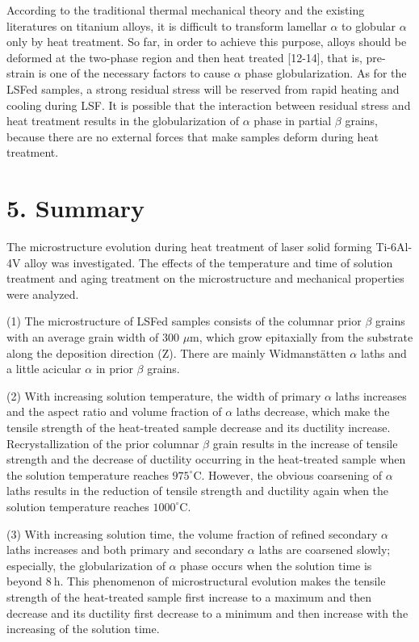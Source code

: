 \documentclass[10pt]{article}
\begin{document}
According to the traditional thermal mechanical theory and the existing literatures on titanium alloys, it is difficult to transform lamellar $\alpha$ to globular $\alpha$ only by heat treatment. So far, in order to achieve this purpose, alloys should be deformed at the two-phase region and then heat treated [12-14], that is, pre-strain is one of the necessary factors to cause $\alpha$ phase globularization. As for the LSFed samples, a strong residual stress will be reserved from rapid heating and cooling during LSF. It is possible that the interaction between residual stress and heat treatment results in the globularization of $\alpha$ phase in partial $\beta$ grains, because there are no external forces that make samples deform during heat treatment.

\section*{5. Summary}
The microstructure evolution during heat treatment of laser solid forming Ti-6Al-4V alloy was investigated. The effects of the temperature and time of solution treatment and aging treatment on the microstructure and mechanical properties were analyzed.

(1) The microstructure of LSFed samples consists of the columnar prior $\beta$ grains with an average grain width of 300 $\mu \mathrm{m}$, which grow epitaxially from the substrate along the deposition direction (Z). There are mainly Widmanstätten $\alpha$ laths and a little acicular $\alpha$ in prior $\beta$ grains.

(2) With increasing solution temperature, the width of primary $\alpha$ laths increases and the aspect ratio and volume fraction of $\alpha$ laths decrease, which make the tensile strength of the heat-treated sample decrease and its ductility increase. Recrystallization of the prior columnar $\beta$ grain results in the increase of tensile strength and the decrease of ductility occurring in the heat-treated sample when the solution temperature reaches $975^{\circ} \mathrm{C}$. However, the obvious coarsening of $\alpha$ laths results in the reduction of tensile strength and ductility again when the solution temperature reaches $1000^{\circ} \mathrm{C}$.

(3) With increasing solution time, the volume fraction of refined secondary $\alpha$ laths increases and both primary and secondary $\alpha$ laths are coarsened slowly; especially, the globularization of $\alpha$ phase occurs when the solution time is\\
beyond $8 \mathrm{~h}$. This phenomenon of microstructural evolution makes the tensile strength of the heat-treated sample first increase to a maximum and then decrease and its ductility first decrease to a minimum and then increase with the increasing of the solution time.
\end{document}
